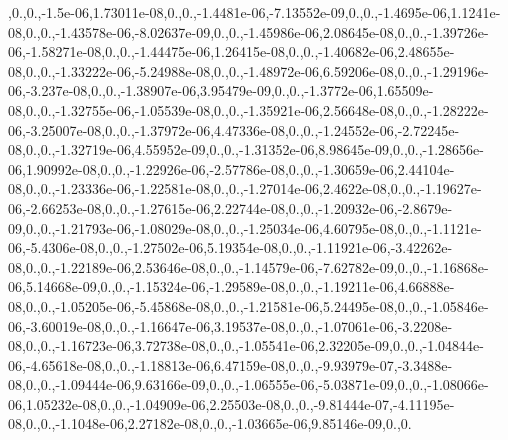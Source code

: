 {,0.,0.,-\/1.\-5e-\/06,1.\-73011e-\/08,0.,0.,-\/1.\-4481e-\/06,-\/7.\-13552e-\/09,0.,0.,-\/1.\-4695e-\/06,1.\-1241e-\/08,0.,0.,-\/1.\-43578e-\/06,-\/8.\-02637e-\/09,0.,0.,-\/1.\-45986e-\/06,2.\-08645e-\/08,0.,0.,-\/1.\-39726e-\/06,-\/1.\-58271e-\/08,0.,0.,-\/1.\-44475e-\/06,1.\-26415e-\/08,0.,0.,-\/1.\-40682e-\/06,2.\-48655e-\/08,0.,0.,-\/1.\-33222e-\/06,-\/5.\-24988e-\/08,0.,0.,-\/1.\-48972e-\/06,6.\-59206e-\/08,0.,0.,-\/1.\-29196e-\/06,-\/3.\-237e-\/08,0.,0.,-\/1.\-38907e-\/06,3.\-95479e-\/09,0.,0.,-\/1.\-3772e-\/06,1.\-65509e-\/08,0.,0.,-\/1.\-32755e-\/06,-\/1.\-05539e-\/08,0.,0.,-\/1.\-35921e-\/06,2.\-56648e-\/08,0.,0.,-\/1.\-28222e-\/06,-\/3.\-25007e-\/08,0.,0.,-\/1.\-37972e-\/06,4.\-47336e-\/08,0.,0.,-\/1.\-24552e-\/06,-\/2.\-72245e-\/08,0.,0.,-\/1.\-32719e-\/06,4.\-55952e-\/09,0.,0.,-\/1.\-31352e-\/06,8.\-98645e-\/09,0.,0.,-\/1.\-28656e-\/06,1.\-90992e-\/08,0.,0.,-\/1.\-22926e-\/06,-\/2.\-57786e-\/08,0.,0.,-\/1.\-30659e-\/06,2.\-44104e-\/08,0.,0.,-\/1.\-23336e-\/06,-\/1.\-22581e-\/08,0.,0.,-\/1.\-27014e-\/06,2.\-4622e-\/08,0.,0.,-\/1.\-19627e-\/06,-\/2.\-66253e-\/08,0.,0.,-\/1.\-27615e-\/06,2.\-22744e-\/08,0.,0.,-\/1.\-20932e-\/06,-\/2.\-8679e-\/09,0.,0.,-\/1.\-21793e-\/06,-\/1.\-08029e-\/08,0.,0.,-\/1.\-25034e-\/06,4.\-60795e-\/08,0.,0.,-\/1.\-1121e-\/06,-\/5.\-4306e-\/08,0.,0.,-\/1.\-27502e-\/06,5.\-19354e-\/08,0.,0.,-\/1.\-11921e-\/06,-\/3.\-42262e-\/08,0.,0.,-\/1.\-22189e-\/06,2.\-53646e-\/08,0.,0.,-\/1.\-14579e-\/06,-\/7.\-62782e-\/09,0.,0.,-\/1.\-16868e-\/06,5.\-14668e-\/09,0.,0.,-\/1.\-15324e-\/06,-\/1.\-29589e-\/08,0.,0.,-\/1.\-19211e-\/06,4.\-66888e-\/08,0.,0.,-\/1.\-05205e-\/06,-\/5.\-45868e-\/08,0.,0.,-\/1.\-21581e-\/06,5.\-24495e-\/08,0.,0.,-\/1.\-05846e-\/06,-\/3.\-60019e-\/08,0.,0.,-\/1.\-16647e-\/06,3.\-19537e-\/08,0.,0.,-\/1.\-07061e-\/06,-\/3.\-2208e-\/08,0.,0.,-\/1.\-16723e-\/06,3.\-72738e-\/08,0.,0.,-\/1.\-05541e-\/06,2.\-32205e-\/09,0.,0.,-\/1.\-04844e-\/06,-\/4.\-65618e-\/08,0.,0.,-\/1.\-18813e-\/06,6.\-47159e-\/08,0.,0.,-\/9.\-93979e-\/07,-\/3.\-3488e-\/08,0.,0.,-\/1.\-09444e-\/06,9.\-63166e-\/09,0.,0.,-\/1.\-06555e-\/06,-\/5.\-03871e-\/09,0.,0.,-\/1.\-08066e-\/06,1.\-05232e-\/08,0.,0.,-\/1.\-04909e-\/06,2.\-25503e-\/08,0.,0.,-\/9.\-81444e-\/07,-\/4.\-11195e-\/08,0.,0.,-\/1.\-1048e-\/06,2.\-27182e-\/08,0.,0.,-\/1.\-03665e-\/06,9.\-85146e-\/09,0.,0.}
